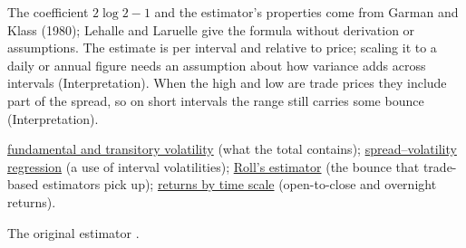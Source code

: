 \begin{qfmethod}
 The coefficient $2\log2-1$ and the estimator's properties come from Garman and Klass (1980); Lehalle and Laruelle give the formula without derivation or assumptions. The estimate is per interval and relative to price; scaling it to a daily or annual figure needs an assumption about how variance adds across intervals (Interpretation). When the high and low are trade prices they include part of the spread, so on short intervals the range still carries some bounce (Interpretation).

 \hyperref[def:volatility-components]{fundamental and transitory volatility} (what the total contains); \hyperref[meth:spread-volatility-regression]{spread--volatility regression} (a use of interval volatilities); \hyperref[res:roll-spread-estimator]{Roll's estimator} (the bounce that trade-based estimators pick up); \hyperref[def:intraday-overnight-returns]{returns by time scale} (open-to-close and overnight returns).

 The original estimator \citep{garman-klass-1980}.

\end{qfmethod}

